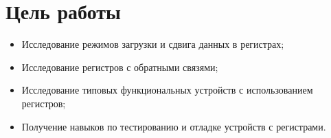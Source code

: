 \documentclass[a4paper,12pt]{article}
\begin{document}
    

    \tableofcontents

    \section{Цель работы}
    \begin{itemize}
        \item Исследование режимов загрузки и сдвига данных в регистрах;
        \item Исследование регистров с обратными связями;
        \item Исследование типовых функциональных устройств с использованием регистров;
        \item Получение навыков по тестированию и отладке устройств с регистрами.
    \end{itemize}
\end{document}

